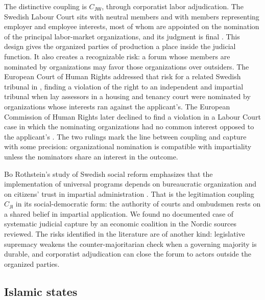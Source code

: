 \documentclass[11pt,letterpaper]{article}
\theoremstyle{definition}
\theoremstyle{remark}
\newcommand{\pJ}{\mathsf{J}}
\newcommand{\pI}{\mathsf{I}}
\newcommand{\pW}{\mathsf{W}}
\begin{document}
The distinctive coupling is $C_{\pJ\pW}$, through corporatist labor adjudication. The Swedish Labour Court sits with neutral members and with members representing employer and employee interests, most of whom are appointed on the nomination of the principal labor-market organizations, and its judgment is final \citep{arbetsdomstolen}. This design gives the organized parties of production a place inside the judicial function. It also creates a recognizable risk: a forum whose members are nominated by organizations may favor those organizations over outsiders. The European Court of Human Rights addressed that risk for a related Swedish tribunal in \citet{langborger1989}, finding a violation of the right to an independent and impartial tribunal when lay assessors in a housing and tenancy court were nominated by organizations whose interests ran against the applicant's. The European Commission of Human Rights later declined to find a violation in a Labour Court case in which the nominating organizations had no common interest opposed to the applicant's \citep{stallarholmens1990}. The two rulings mark the line between coupling and capture with some precision: organizational nomination is compatible with impartiality unless the nominators share an interest in the outcome.

Bo Rothstein's study of Swedish social reform emphasizes that the implementation of universal programs depends on bureaucratic organization and on citizens' trust in impartial administration \citep{rothstein1996}. That is the legitimation coupling $C_{\pJ\pI}$ in its social-democratic form: the authority of courts and ombudsmen rests on a shared belief in impartial application. We found no documented case of systematic judicial capture by an economic coalition in the Nordic sources reviewed. The risks identified in the literature are of another kind: legislative supremacy weakens the counter-majoritarian check when a governing majority is durable, and corporatist adjudication can close the forum to actors outside the organized parties.

\subsection{Islamic states}
\end{document}
